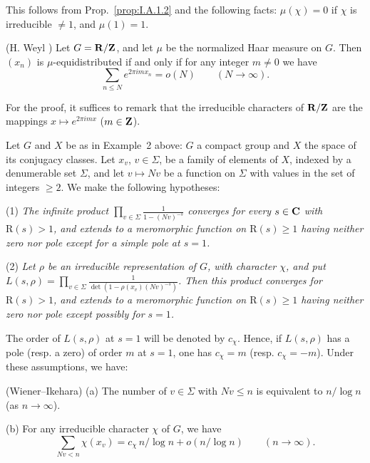 This follows from Prop.~\ref{prop:I.A.1.2} and the following facts:
$\mu(\chi) = 0$ if $\chi$ is irreducible $\neq 1$, and $\mu(1) = 1$.

\begin{corollary}[2]\label{cor:I.A.1.2}\texorpdfstring{(H. Weyl \cite{weyl-gleichv})}{}
Let $G = \mathbf{R}/\mathbf{Z}$, and let $\mu$ be the normalized Haar measure on $G$. Then $(x_n)$ is $\mu$-equidistributed if and only if for any integer $m \neq 0$ we have
\[
\sum_{n \leq N} e^{2\pi i m x_n} = o(N) \qquad (N \to \infty).
\]
\end{corollary}

For the proof, it suffices to remark that the irreducible characters of $\mathbf{R}/\mathbf{Z}$ are the mappings $x \mapsto e^{2\pi imx}$ ($m \in \mathbf{Z}$).


Let $G$ and $X$ be as in Example~2 above: $G$ a compact group and $X$ the space of its conjugacy classes. Let $x_v$, $v \in \Sigma$, be a family of elements of $X$, indexed by a denumerable set $\Sigma$, and let $v \mapsto Nv$ be a function on $\Sigma$ with values in the set of integers $\geq 2$. We make the following hypotheses:

(1) \emph{The infinite product $\prod_{v \in \Sigma} \frac{1}{1 - (Nv)^{-s}}$ converges for every $s \in \mathbf{C}$ with $\mathrm{R}(s) > 1$, and extends to a meromorphic function on $\mathrm{R}(s) \geq 1$ having neither zero nor pole except for a simple pole at $s = 1$.}

(2) \emph{Let $\rho$ be an irreducible representation of $G$, with character $\chi$, and put $L(s, \rho) = \prod_{v \in \Sigma} \frac{1}{\det(1 - \rho(x_v)(Nv)^{-s})}$. Then this product converges for $\mathrm{R}(s) > 1$, and extends to a meromorphic function on $\mathrm{R}(s) \geq 1$ having neither zero nor pole except possibly for $s = 1$.}

The order of $L(s, \rho)$ at $s = 1$ will be denoted by $c_\chi$. Hence, if $L(s, \rho)$ has a pole (resp. a zero) of order $m$ at $s = 1$, one has $c_\chi = m$ (resp. $c_\chi = -m$). Under these assumptions, we have:

\begin{theorem}[1]\label{thm:I.A.2.1}\texorpdfstring{(Wiener--Ikehara)}{}
(a) The number of $v \in \Sigma$ with $Nv \leq n$ is equivalent to $n/\log n$ (as $n \to \infty$).

(b) For any irreducible character $\chi$ of $G$, we have
\[
\sum_{Nv < n} \chi(x_v) = c_\chi \, n/\log n + o(n/\log n) \qquad (n \to \infty).
\]
\end{theorem}

